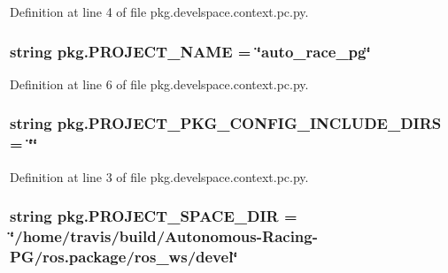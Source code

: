 Definition at line 4 of file pkg.\+develspace.\+context.\+pc.\+py.

\subsubsection[{\texorpdfstring{P\+R\+O\+J\+E\+C\+T\+\_\+\+N\+A\+ME}{PROJECT_NAME}}]{\setlength{\rightskip}{0pt plus 5cm}string pkg.\+P\+R\+O\+J\+E\+C\+T\+\_\+\+N\+A\+ME = \char`\"{}auto\+\_\+race\+\_\+pg\char`\"{}}\hypertarget{namespacepkg_a7dfbe99257c26f5e4a3a5483995d9ddc}{}\label{namespacepkg_a7dfbe99257c26f5e4a3a5483995d9ddc}


Definition at line 6 of file pkg.\+develspace.\+context.\+pc.\+py.

\subsubsection[{\texorpdfstring{P\+R\+O\+J\+E\+C\+T\+\_\+\+P\+K\+G\+\_\+\+C\+O\+N\+F\+I\+G\+\_\+\+I\+N\+C\+L\+U\+D\+E\+\_\+\+D\+I\+RS}{PROJECT_PKG_CONFIG_INCLUDE_DIRS}}]{\setlength{\rightskip}{0pt plus 5cm}string pkg.\+P\+R\+O\+J\+E\+C\+T\+\_\+\+P\+K\+G\+\_\+\+C\+O\+N\+F\+I\+G\+\_\+\+I\+N\+C\+L\+U\+D\+E\+\_\+\+D\+I\+RS = \char`\"{}\char`\"{}}\hypertarget{namespacepkg_a2760bf8266ff58da440f65ee91b203ab}{}\label{namespacepkg_a2760bf8266ff58da440f65ee91b203ab}


Definition at line 3 of file pkg.\+develspace.\+context.\+pc.\+py.

\subsubsection[{\texorpdfstring{P\+R\+O\+J\+E\+C\+T\+\_\+\+S\+P\+A\+C\+E\+\_\+\+D\+IR}{PROJECT_SPACE_DIR}}]{\setlength{\rightskip}{0pt plus 5cm}string pkg.\+P\+R\+O\+J\+E\+C\+T\+\_\+\+S\+P\+A\+C\+E\+\_\+\+D\+IR = \char`\"{}/home/travis/build/Autonomous-\/Racing-\/PG/ros.\+package/ros\+\_\+ws/devel\char`\"{}}\hypertarget{namespacepkg_a3f0f1b4bc03c596525e025539ca4332f}{}\label{namespacepkg_a3f0f1b4bc03c596525e025539ca4332f}


